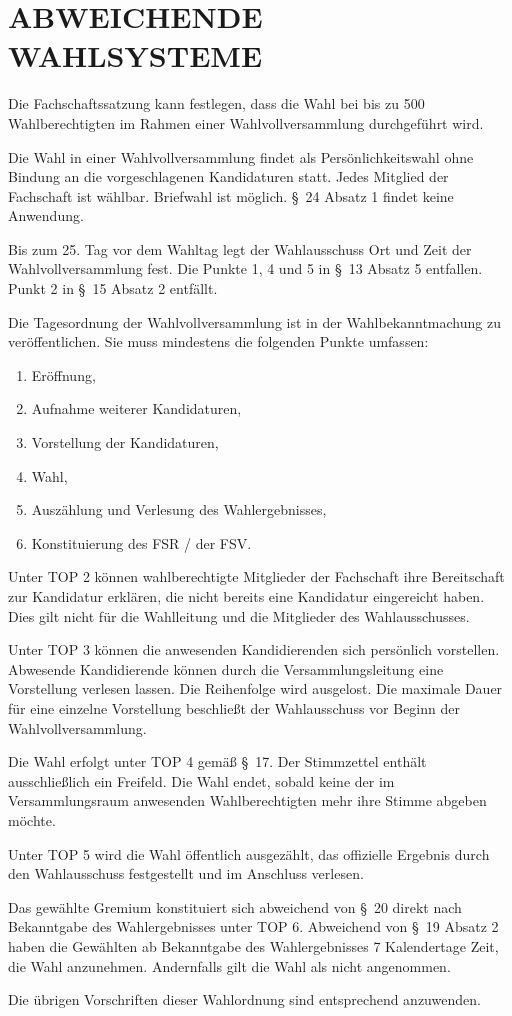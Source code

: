 \documentclass[%
draft,%
multilinesections%
]{fswo}
\begin{document}
\section{ABWEICHENDE WAHLSYSTEME}
\begin{contract}
\label{cls-wahlvollversammlung}
Die Fachschaftssatzung kann festlegen, dass die Wahl bei bis zu 500 Wahlberechtigten im Rahmen einer Wahlvollversammlung durchgeführt wird.

Die Wahl in einer Wahlvollversammlung findet als Persönlichkeitswahl ohne Bindung an die vorgeschlagenen Kandidaturen statt.
Jedes Mitglied der Fachschaft ist wählbar.
Briefwahl ist möglich.
\S~24 Absatz 1 findet keine Anwendung.

Bis zum 25. Tag vor dem Wahltag legt der Wahlausschuss Ort und Zeit der Wahlvollversammlung fest.
Die Punkte 1, 4 und 5 in \S~13 Absatz 5 entfallen. Punkt 2 in \S~15 Absatz 2 entfällt.

Die Tagesordnung der Wahlvollversammlung ist in der Wahlbekanntmachung zu veröffentlichen.
Sie muss mindestens die folgenden Punkte umfassen:
\begin{enumerate}
\item Eröffnung,
\item Aufnahme weiterer Kandidaturen,
\item Vorstellung der Kandidaturen,
\item Wahl,
\item Auszählung und Verlesung des Wahlergebnisses,
\item Konstituierung des FSR / der FSV.
\end{enumerate}

Unter TOP 2 können wahlberechtigte Mitglieder der Fachschaft ihre Bereitschaft zur Kandidatur erklären, die nicht bereits eine Kandidatur eingereicht haben.
Dies gilt nicht für die Wahlleitung und die Mitglieder des Wahlausschusses.

Unter TOP 3 können die anwesenden Kandidierenden sich persönlich vorstellen.
Abwesende Kandidierende können durch die Versammlungsleitung eine Vorstellung verlesen lassen.
Die Reihenfolge wird ausgelost.
Die maximale Dauer für eine einzelne Vorstellung beschließt der Wahlausschuss vor Beginn der Wahlvollversammlung.

Die Wahl erfolgt unter TOP 4 gemäß \S~17.
Der Stimmzettel enthält ausschließlich ein Freifeld.
Die Wahl endet, sobald keine der im Versammlungsraum anwesenden Wahlberechtigten mehr ihre Stimme abgeben möchte.

Unter TOP 5 wird die Wahl öffentlich ausgezählt, das offizielle Ergebnis durch den Wahlausschuss festgestellt und im Anschluss verlesen.

Das gewählte Gremium konstituiert sich abweichend von \S~20 direkt nach Bekanntgabe des Wahlergebnisses unter TOP 6.
Abweichend von \S~19 Absatz 2 haben die Gewählten ab Bekanntgabe des Wahlergebnisses 7 Kalendertage Zeit, die Wahl anzunehmen.
Andernfalls gilt die Wahl als nicht angenommen.

Die übrigen Vorschriften dieser Wahlordnung sind entsprechend anzuwenden.
\end{contract}
\end{document}
